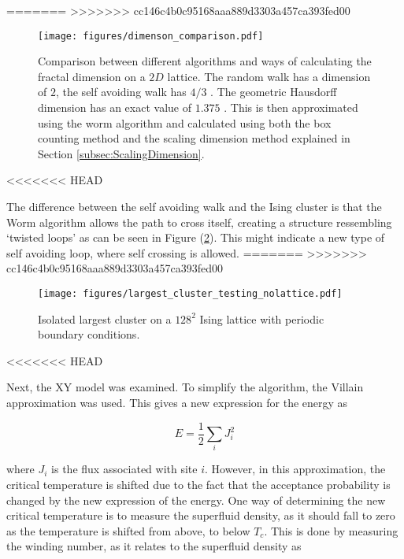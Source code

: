 =======
>>>>>>> cc146c4b0c95168aaa889d3303a457ca393fed00
\begin{figure}[h!]
    \centering
        \texttt{[image: figures/dimenson\_comparison.pdf]}
    \caption{Comparison between different algorithms and ways of calculating the fractal dimension on a $2D$ lattice. The random walk has a dimension of $2$, the self avoiding walk has $4/3$ \cite{Vilgis:FlorySAW}. The geometric Hausdorff dimension has an exact value of $1.375$ \cite{Duplantier:GeoHausdorff}. This is then approximated using the worm algorithm and calculated using both the box counting method and the scaling dimension method explained in Section \ref{subsec:ScalingDimension}.}
    \label{fig:comparsion_2d_lattice_dimensions}
\end{figure}

<<<<<<< HEAD
\newpage

\noindent The difference between the self avoiding walk and the Ising cluster is that the Worm algorithm allows the path to cross itself, creating a structure ressembling `twisted loops' as can be seen in Figure (\ref{fig:largest_cluster_illu}). This might indicate a new type of self avoiding loop, where self crossing is allowed.
=======
>>>>>>> cc146c4b0c95168aaa889d3303a457ca393fed00

\begin{figure}[h!]
    \centering
        \texttt{[image: figures/largest\_cluster\_testing\_nolattice.pdf]}
    \caption{Isolated largest cluster on a $128^2$ Ising lattice with periodic boundary conditions.}
    \label{fig:largest_cluster_illu}
\end{figure}

<<<<<<< HEAD
\newpage

Next, the XY model was examined. To simplify the algorithm, the Villain approximation \cite{Villain:VillainOriginalPaper} was used. This gives a new expression for the energy as

\begin{equation}
    E = \frac{1}{2} \sum_i J^2_i
\label{eq:results_villain_energy}
\end{equation}

where $J_i$ is the flux associated with site $i$. However, in this approximation, the critical temperature is shifted due to the fact that the acceptance probability is changed by the new expression of the energy. One way of determining the new critical temperature is to measure the superfluid density, as it should fall to zero as the temperature is shifted from above, to below $T_c$. This is done by measuring the winding number, as it relates to the superfluid density as

